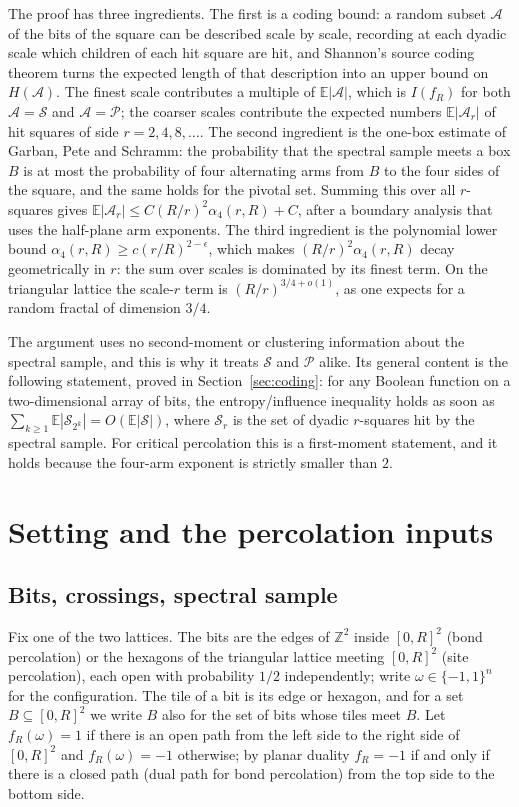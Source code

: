 \documentclass[11pt]{amsart}
\theoremstyle{remark}
\newcommand{\EE}{\mathbb{E}}
\newcommand{\ZZ}{\mathbb{Z}}
\newcommand{\Sc}{\mathcal{S}}
\newcommand{\Pc}{\mathcal{P}}
\begin{document}
The proof has three ingredients. The first is a coding bound: a random subset $\mathcal A$ of the bits of the square can be described scale by scale, recording at each dyadic scale which children of each hit square are hit, and Shannon's source coding theorem turns the expected length of that description into an upper bound on $H(\mathcal A)$. The finest scale contributes a multiple of $\EE|\mathcal A|$, which is $I(f_R)$ for both $\mathcal A=\Sc$ and $\mathcal A=\Pc$; the coarser scales contribute the expected numbers $\EE|\mathcal A_r|$ of hit squares of side $r=2,4,8,\dots$. The second ingredient is the one-box estimate of Garban, Pete and Schramm: the probability that the spectral sample meets a box $B$ is at most the probability of four alternating arms from $B$ to the four sides of the square, and the same holds for the pivotal set. Summing this over all $r$-squares gives $\EE|\mathcal A_r|\le C(R/r)^2\alpha_4(r,R)+C$, after a boundary analysis that uses the half-plane arm exponents. The third ingredient is the polynomial lower bound $\alpha_4(r,R)\ge c(r/R)^{2-\epsilon}$, which makes $(R/r)^2\alpha_4(r,R)$ decay geometrically in $r$: the sum over scales is dominated by its finest term. On the triangular lattice the scale-$r$ term is $(R/r)^{3/4+o(1)}$, as one expects for a random fractal of dimension $3/4$.

The argument uses no second-moment or clustering information about the spectral sample, and this is why it treats $\Sc$ and $\Pc$ alike. Its general content is the following statement, proved in Section~\ref{sec:coding}: for any Boolean function on a two-dimensional array of bits, the entropy/influence inequality holds as soon as $\sum_{k\ge1}\EE|\Sc_{2^k}|=O(\EE|\Sc|)$, where $\Sc_r$ is the set of dyadic $r$-squares hit by the spectral sample. For critical percolation this is a first-moment statement, and it holds because the four-arm exponent is strictly smaller than $2$.

\section{Setting and the percolation inputs}\label{sec:setup}

\subsection{Bits, crossings, spectral sample}
Fix one of the two lattices. The bits are the edges of $\ZZ^2$ inside $[0,R]^2$ (bond percolation) or the hexagons of the triangular lattice meeting $[0,R]^2$ (site percolation), each open with probability $1/2$ independently; write $\omega\in\{-1,1\}^{n}$ for the configuration. The tile of a bit is its edge or hexagon, and for a set $B\subseteq[0,R]^2$ we write $B$ also for the set of bits whose tiles meet $B$. Let $f_R(\omega)=1$ if there is an open path from the left side to the right side of $[0,R]^2$ and $f_R(\omega)=-1$ otherwise; by planar duality $f_R=-1$ if and only if there is a closed path (dual path for bond percolation) from the top side to the bottom side.
\end{document}

